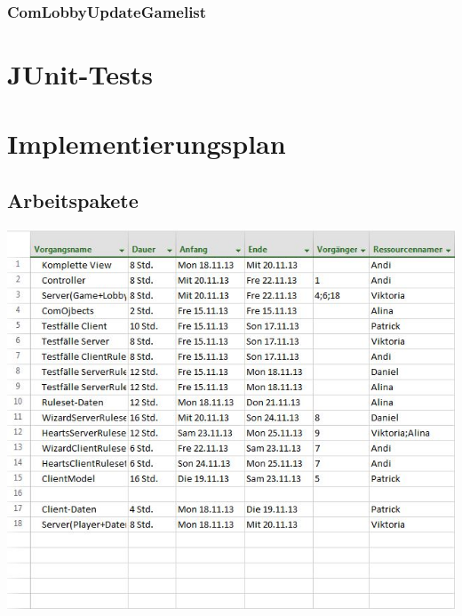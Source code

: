 \documentclass{article}
\begin{document}
\subsubsection{ComLobbyUpdateGamelist}
\newpage

\section{JUnit-Tests}
\newpage

\section{Implementierungsplan}
\subsection{Arbeitspakete}
\includegraphics[scale=0.9]{Arbeitspakete}
\end{document}

